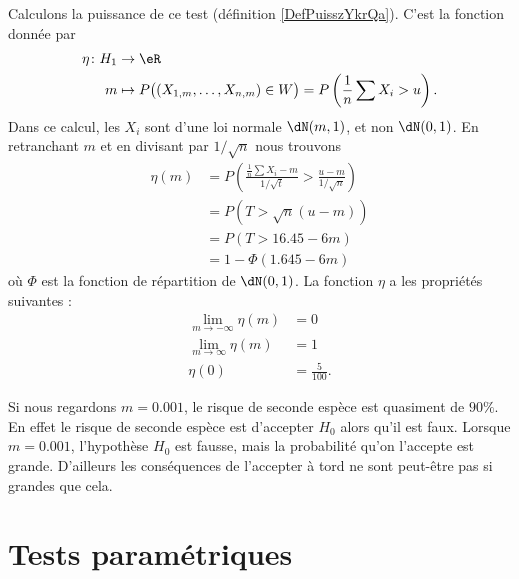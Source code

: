 Calculons la puissance de ce test (définition \ref{DefPuisszYkrQa}). C'est la fonction donnée par
    \begin{equation}
        \begin{aligned}
            \eta\colon H_1&\to \eR \\
            m&\mapsto P\big( (X_{1,m},\ldots, X_{n,m})\in W \big)=P\left( \frac{1}{ n }\sum X_i>u \right) .
        \end{aligned}
    \end{equation}
    Dans ce calcul, les \( X_i\) sont d'une loi normale \( \dN(m,1)\), et non \( \dN(0,1)\). En retranchant \( m\) et en divisant par \( 1/\sqrt{n}\) nous trouvons
    \begin{subequations}
        \begin{align}
            \eta(m)&=P\left( \frac{ \frac{1}{ n }\sum X_i-m }{ 1/\sqrt{t} }>\frac{ u-m }{ 1/\sqrt{n} } \right) \\    
            &=P(T>\sqrt{n}(u-m))\\
            &=P(T>16.45-6m)\\
            &=1-\Phi(1.645-6m)
        \end{align}
    \end{subequations}
où \( \Phi\) est la fonction de répartition de \( \dN(0,1)\). La fonction \( \eta\) a les propriétés suivantes :
\begin{subequations}
    \begin{align}
        \lim_{m\to-\infty}\eta(m)&=0\\
        \lim_{m\to\infty}\eta(m)&=1\\
        \eta(0)&=\frac{ 5 }{ 100 }.
    \end{align}
\end{subequations}

\begin{remark}
    Si nous regardons \( m=0.001\), le risque de seconde espèce est quasiment de \( 90\%\). En effet le risque de seconde espèce est d'accepter \( H_0\) alors qu'il est faux. Lorsque \( m=0.001\), l'hypothèse \( H_0\) est fausse, mais la probabilité qu'on l'accepte est grande. D'ailleurs les conséquences de l'accepter à tord ne sont peut-être pas si grandes que cela.
\end{remark}

\section{Tests paramétriques}

